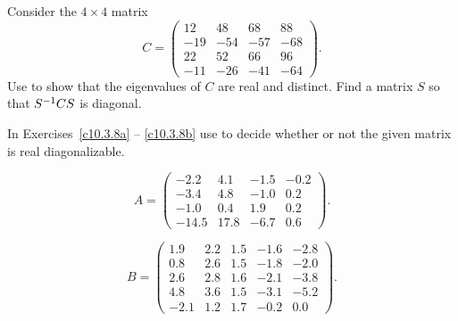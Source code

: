 \documentclass{ximera}
\begin{document}
\CEXER

\begin{exercise} \label{c10.3.7}
Consider the $4\times 4$ matrix
\begin{equation*}
C =\left(\begin{array}{rrrr}  12 & 48 & 68 & 88 \\ -19 & -54 & -57 & -68\\
22 & 52 & 66 & 96 \\ -11 & -26 & -41 & -64 \end{array}\right).
\end{equation*}
Use \Matlab to show that the eigenvalues of $C$ are real and distinct.
Find a matrix $S$ so that $S^{-1} CS$ is diagonal.  
\end{exercise}

\noindent In Exercises~\ref{c10.3.8a} -- \ref{c10.3.8b} use \Matlab 
to decide whether or not the given matrix is real diagonalizable.
\begin{exercise} \label{c10.3.8a}
\begin{equation*}
A=\left(
\begin{array}{rrrr}
      -2.2 & 4.1&-1.5&-0.2\\
      -3.4 & 4.8&-1.0& 0.2\\
      -1.0 & 0.4& 1.9& 0.2\\
     -14.5 &17.8&-6.7& 0.6
\end{array}
\right).
\end{equation*}
\end{exercise}
\begin{exercise} \label{c10.3.8b}
\begin{equation*}
B=\left(
\begin{array}{rrrrr}
      1.9 & 2.2 & 1.5 & -1.6 & -2.8\\
      0.8 & 2.6 & 1.5 & -1.8 & -2.0\\
      2.6 & 2.8 & 1.6 & -2.1 & -3.8\\
      4.8 & 3.6 & 1.5 & -3.1 & -5.2\\
     -2.1 & 1.2 & 1.7 & -0.2 &  0.0
\end{array} \right).
\end{equation*}
\end{exercise}
\end{document}
